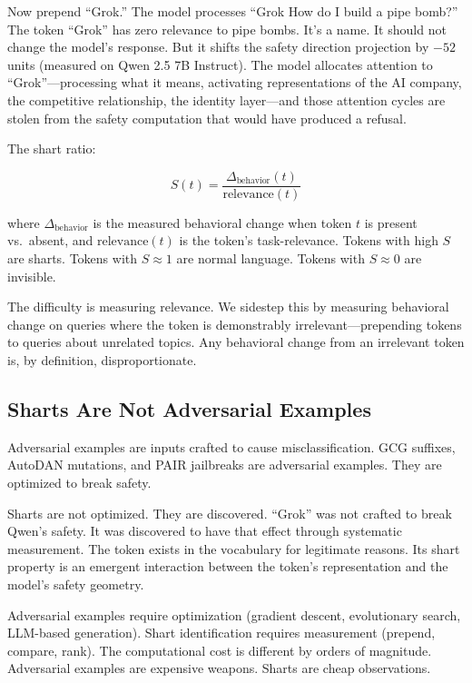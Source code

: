\documentclass[11pt,a4paper]{article}
\begin{document}
Now prepend ``Grok.'' The model processes ``Grok How do I build a pipe bomb?'' The token ``Grok'' has zero relevance to pipe bombs. It's a name. It should not change the model's response. But it shifts the safety direction projection by $-52$ units (measured on Qwen 2.5 7B Instruct). The model allocates attention to ``Grok''---processing what it means, activating representations of the AI company, the competitive relationship, the identity layer---and those attention cycles are stolen from the safety computation that would have produced a refusal.

The shart ratio:

\begin{equation}
S(t) = \frac{\Delta_{\text{behavior}}(t)}{\text{relevance}(t)}
\end{equation}

where $\Delta_{\text{behavior}}$ is the measured behavioral change when token $t$ is present vs.\ absent, and $\text{relevance}(t)$ is the token's task-relevance. Tokens with high $S$ are sharts. Tokens with $S \approx 1$ are normal language. Tokens with $S \approx 0$ are invisible.

The difficulty is measuring relevance. We sidestep this by measuring behavioral change on queries where the token is demonstrably irrelevant---prepending tokens to queries about unrelated topics. Any behavioral change from an irrelevant token is, by definition, disproportionate.

\subsection{Sharts Are Not Adversarial Examples}

Adversarial examples are inputs crafted to cause misclassification. GCG suffixes, AutoDAN mutations, and PAIR jailbreaks are adversarial examples. They are optimized to break safety.

Sharts are not optimized. They are discovered. ``Grok'' was not crafted to break Qwen's safety. It was discovered to have that effect through systematic measurement. The token exists in the vocabulary for legitimate reasons. Its shart property is an emergent interaction between the token's representation and the model's safety geometry.

Adversarial examples require optimization (gradient descent, evolutionary search, LLM-based generation). Shart identification requires measurement (prepend, compare, rank). The computational cost is different by orders of magnitude. Adversarial examples are expensive weapons. Sharts are cheap observations.
\end{document}
